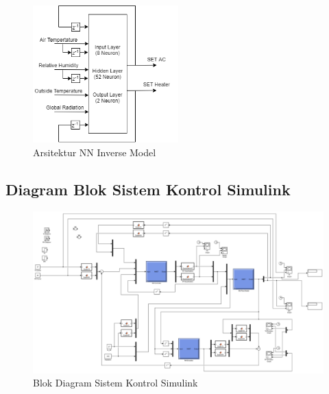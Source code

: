\begin{figure}[!h]
	\centering
	\includegraphics[width=0.5\textwidth]{figures/NNInverseModelDesign}
	\caption{Arsitektur NN Inverse Model}
	\label{fig:C:NNInverseModelDesign}
\end{figure}

\begin{landscape}
	\section{Diagram Blok Sistem Kontrol Simulink}
	\begin{figure}[!h]
		\centering
		\includegraphics[width=1.5\textwidth]{figures/SimulinkBlockDiagram}
		\caption{Blok Diagram Sistem Kontrol Simulink}
		\label{fig:C:SimulinkBlockDiagram}
	\end{figure}
\end{landscape}